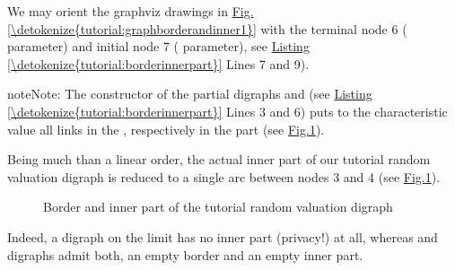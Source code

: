 \documentclass[a4paper,12pt,english]{sphinxhowto}
\let\sphinxpxdimen\pdfpxdimen\else\newdimen\sphinxpxdimen
\begin{document}
We may orient the graphviz drawings in \hyperref[\detokenize{tutorial:graphborderandinner1}]{Fig.\@ \ref{\detokenize{tutorial:graphborderandinner1}}} with the terminal node 6 ( parameter) and initial node 7 ( parameter), see \hyperref[\detokenize{tutorial:borderinnerpart}]{Listing \ref{\detokenize{tutorial:borderinnerpart}}} Lines 7 and 9).

\begin{sphinxadmonition}{note}{Note:}
The constructor of the partial digraphs  and   (see \hyperref[\detokenize{tutorial:borderinnerpart}]{Listing \ref{\detokenize{tutorial:borderinnerpart}}} Lines 3 and 6) puts to the  characteristic value all links  in the , respectively  in the  part (see \hyperref[\detokenize{tutorial:graphborderandinner}]{Fig.\@ \ref{\detokenize{tutorial:graphborderandinner}}}).
\end{sphinxadmonition}

Being much  than a linear order, the actual inner part of our tutorial random valuation digraph  is reduced to a single arc between nodes 3 and 4 (see \hyperref[\detokenize{tutorial:graphborderandinner}]{Fig.\@ \ref{\detokenize{tutorial:graphborderandinner}}}).

\begin{figure}[H]
\centering
\capstart

\noindent\sphinxincludegraphics[width=600\sphinxpxdimen]{{graphBorderAndInner}.png}
\caption{Border and inner part of the tutorial random valuation digraph }\label{\detokenize{tutorial:graphborderandinner}}\end{figure}

Indeed, a  digraph on the limit has no inner part (privacy!) at all, whereas  and  digraphs admit both, an empty border and an empty inner part.
\end{document}
